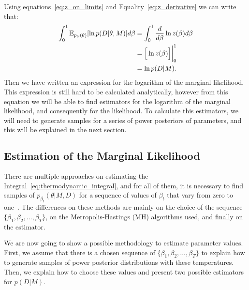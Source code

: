 Using equations~\ref{eq:z_on_limits} and Equality~\ref{eq:z_derivative}
we can write that:
\begin{align}
    \int_0^1 \mathbb{E}_{p_\beta (\theta)} [\ln p(D|\theta, M)]d\beta 
    &= \int_0^1 \frac{d}{d\beta} \ln z(\beta) d\beta \notag \\
    &= \Big[\ln z(\beta)\Big]\bigg\rvert^1_0 \notag \\
    &= \ln p (D | M).
    \label{eq:thermodynamic_integral}
\end{align}
Then we have written an expression for the logarithm of the marginal
likelihood. This expression is still hard to be calculated analytically,
however from this equation we will be able to find estimators for
the logarithm of the marginal likelihood, and consequently for the
likelihood. To calculate this estimators, we will need to generate 
samples for a series of power posteriors of parameters, and this will
be explained in the next section.

\subsection{Estimation of the Marginal Likelihood}
There are multiple approaches on estimating the 
Integral~\ref{eq:thermodynamic_integral}, and for all of them, it is 
necessary to find samples of $p_{\beta_t} (\theta | M, D)$ for a 
sequence of values of $\beta_t$ that vary from zero to one~\cite{Xura20, 
Vyshemirsky2007, Friel2008}. The differences on these methods are mainly 
on the choice of the sequence $\{\beta_1, \beta_2, \ldots, \beta_T\}$,
on the Metropolis-Hastings (MH) algorithms used, and finally on the 
estimator.

We are now going to show a possible methodology to estimate parameter 
values. First, we assume that there is a chosen sequence of 
$\{\beta_1, \beta_2, \ldots, \beta_T\}$ to explain how to generate 
samples of power posterior distributions with these temperatures. Then, 
we explain how to choose these values and present two possible 
estimators for $p (D | M)$.

